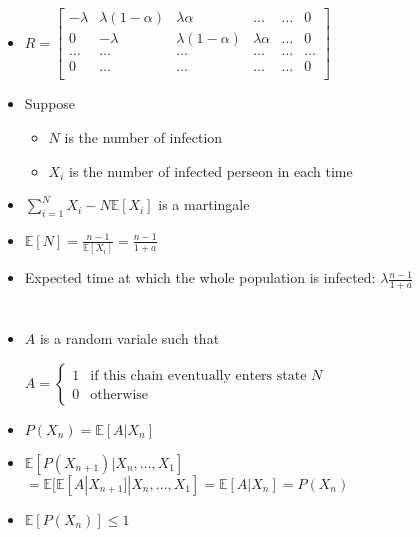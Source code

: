 \documentclass[a4paper]{article}
\begin{document}
\section{}
\begin{itemize}
        \begin{figure} [H]
            \texttt{[image: image/6.png]}
        \end{figure}
    \item $R = \left[ \begin{array}{cccccc}
                -\lambda & \lambda(1-\alpha) & \lambda \alpha & \dots & \dots & 0 \\
                0 & -\lambda & \lambda(1-\alpha) & \lambda \alpha & \dots & 0 \\
                \dots & \dots & \dots & \dots & \dots & \dots \\
                0 & \dots & \dots & \dots & \dots & 0 \\
            \end{array} \right]$
    \item Suppose
        \begin{itemize}
            \item $N$ is the number of infection
            \item $X_i$ is the number of infected perseon in each time
        \end{itemize}
    \item $\sum_{i=1}^N X_i - N \mathbb{E}[X_i]$ is a martingale
    \item $\mathbb{E}[N] = \frac{n-1}{\mathbb{E}[X_i]} = \frac{n-1}{1+a}$
    \item Expected time at which the whole population is infected: $\lambda \frac{n-1}{1+a}$
\end{itemize}

\section{}
\begin{itemize}
        \begin{figure} [H]
            \texttt{[image: image/7.png]}
        \end{figure}
    \item $A$ is a random variale such that

        $A = \left\{ \begin{array}{cc} 1 & \text{if this chain eventually enters state $N$} \\ 0 & \text{otherwise} \end{array} \right.$
    \item $P(X_n) = \mathbb{E}[A|X_n]$
    \item $\mathbb{E}[P(X_{n+1})| X_n, \dots, X_1]$
        $= \mathbb{E}[\mathbb{E}[A|X_{n+1}]| X_n, \dots, X_1] = \mathbb{E}[A|X_n] = P(X_n)$
    \item $\mathbb{E}[P(X_n)] \leq 1$
\end{itemize}
\end{document}
